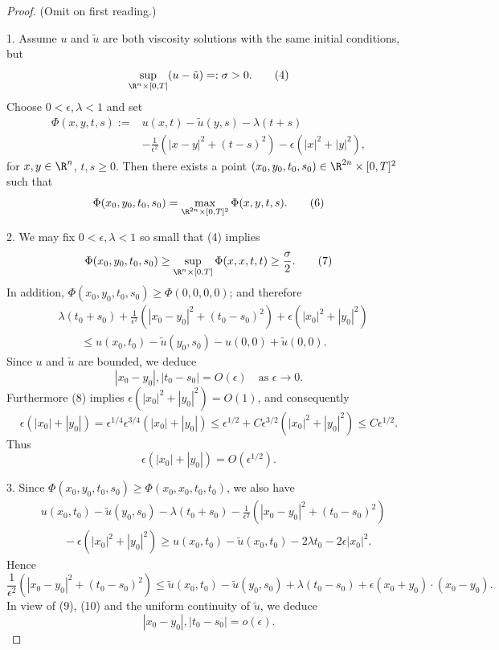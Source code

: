 \begin{proof}
(Omit on first reading.)

1. Assume $u$ and $\tilde{u}$ are both viscosity solutions with the same initial conditions, but
\[
\sup_{\R^n \times [0,T]} (u - \tilde{u}) =: \sigma > 0.
\tag{4}
\]
Choose $0 < \epsilon, \lambda < 1$ and set
\[
\begin{aligned}
\Phi(x,y,t,s) :={}& u(x,t) - \tilde{u}(y,s) - \lambda(t + s) \\
&- \frac{1}{\epsilon^2}(|x - y|^2 + (t - s)^2) - \epsilon(|x|^2 + |y|^2),
\end{aligned}
\tag{5}
\]
for $x,y \in \R^n$, $t,s \geq 0$. Then there exists a point $(x_0,y_0,t_0,s_0) \in \R^{2n} \times [0,T]^2$ such that
\[
\Phi(x_0,y_0,t_0,s_0) = \max_{\R^{2n} \times [0,T]^2} \Phi(x,y,t,s).
\tag{6}
\]

2. We may fix $0 < \epsilon, \lambda < 1$ so small that (4) implies
\[
\Phi(x_0,y_0,t_0,s_0) \geq \sup_{\R^n \times [0,T]} \Phi(x,x,t,t) \geq \frac{\sigma}{2}.
\tag{7}
\]
In addition, $\Phi(x_0,y_0,t_0,s_0) \geq \Phi(0,0,0,0)$; and therefore
\[
\begin{aligned}
&\lambda(t_0 + s_0) + \frac{1}{\epsilon^2}(|x_0 - y_0|^2 + (t_0 - s_0)^2) + \epsilon(|x_0|^2 + |y_0|^2) \\
&\qquad \leq u(x_0,t_0) - \tilde{u}(y_0,s_0) - u(0,0) + \tilde{u}(0,0).
\end{aligned}
\tag{8}
\]
Since $u$ and $\tilde{u}$ are bounded, we deduce
\[
|x_0 - y_0|, |t_0 - s_0| = O(\epsilon) \quad \text{as } \epsilon \to 0.
\tag{9}
\]
Furthermore (8) implies $\epsilon(|x_0|^2 + |y_0|^2) = O(1)$, and consequently
\[
\epsilon(|x_0| + |y_0|) = \epsilon^{1/4}\epsilon^{3/4}(|x_0| + |y_0|) \leq \epsilon^{1/2} + C\epsilon^{3/2}(|x_0|^2 + |y_0|^2) \leq C\epsilon^{1/2}.
\]
Thus
\[
\epsilon(|x_0| + |y_0|) = O(\epsilon^{1/2}).
\tag{10}
\]

3. Since $\Phi(x_0,y_0,t_0,s_0) \geq \Phi(x_0,x_0,t_0,t_0)$, we also have
\[
\begin{aligned}
&u(x_0,t_0) - \tilde{u}(y_0,s_0) - \lambda(t_0 + s_0) - \frac{1}{\epsilon^2}(|x_0 - y_0|^2 + (t_0 - s_0)^2) \\
&\qquad - \epsilon(|x_0|^2 + |y_0|^2) \geq u(x_0,t_0) - \tilde{u}(x_0,t_0) - 2\lambda t_0 - 2\epsilon|x_0|^2.
\end{aligned}
\]
Hence
\[
\frac{1}{\epsilon^2}(|x_0 - y_0|^2 + (t_0 - s_0)^2) \leq \tilde{u}(x_0,t_0) - \tilde{u}(y_0,s_0) + \lambda(t_0 - s_0) + \epsilon(x_0 + y_0) \cdot (x_0 - y_0).
\]
In view of (9), (10) and the uniform continuity of $\tilde{u}$, we deduce
\[
|x_0 - y_0|, |t_0 - s_0| = o(\epsilon).
\tag{11}
\]


\end{proof}
